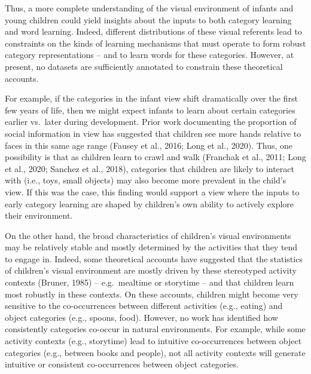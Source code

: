 \documentclass[10pt, letterpaper]{article}
\begin{document}
Thus, a more complete understanding of the visual environment of infants
and young children could yield insights about the inputs to both
category learning and word learning. Indeed, different distributions of
these visual referents lead to constraints on the kinds of learning
mechanisms that must operate to form robust category representations --
and to learn words for these categories. However, at present, no
datasets are sufficiently annotated to constrain these theoretical
accounts.

For example, if the categories in the infant view shift dramatically
over the first few years of life, then we might expect infants to learn
about certain categories earlier vs.~later during development. Prior
work documenting the proportion of social information in view has
suggested that children see more hands relative to faces in this same
age range (Fausey et al., 2016; Long et al., 2020). Thus, one
possibility is that as children learn to crawl and walk (Franchak et
al., 2011; Long et al., 2020; Sanchez et al., 2018), categories that
children are likely to interact with (i.e., toys, small objects) may
also become more prevalent in the child's view. If this was the case,
this finding would support a view where the inputs to early category
learning are shaped by children's own ability to actively explore their
environment.

On the other hand, the broad characteristics of children's visual
environments may be relatively stable and mostly determined by the
activities that they tend to engage in. Indeed, some theoretical
accounts have suggested that the statistics of children's visual
environment are mostly driven by these stereotyped activity contexts
(Bruner, 1985) -- e.g.~mealtime or storytime -- and that children learn
most robustly in these contexts. On these accounts, children might
become very sensitive to the co-occurrences between different activities
(e.g., eating) and object categories (e.g., spoons, food). However, no
work has identified how consistently categories co-occur in natural
environments. For example, while some activity contexts (e.g.,
storytime) lead to intuitive co-occurrences between object categories
(e.g., between books and people), not all activity contexts will
generate intuitive or consistent co-occurrences between object
categories.
\end{document}
